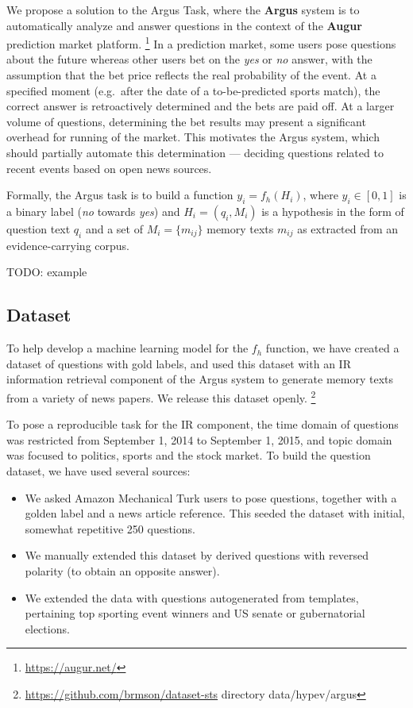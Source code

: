 \documentclass[11pt]{article}
\begin{document}
We propose a solution to the Argus Task, where
the \textbf{Argus} system \cite{arguswp} \cite{argus}
is to automatically analyze and answer questions
in the context of the \textbf{Augur} prediction market platform.%
\footnote{\url{https://augur.net/}}
In a prediction market, some users pose questions about the future
whereas other users bet on the \textit{yes} or \textit{no} answer,
with the assumption that the bet price reflects the real probability
of the event.  At a specified moment (e.g.\ after the date of a to-be-predicted sports match), the
correct answer is retroactively determined and the bets are paid off.
At a larger volume of questions, determining the bet results may
present a significant overhead for running of the market.
This motivates the Argus system, which should partially automate
this determination --- deciding questions related to recent events
based on open news sources.

Formally, the Argus task is to build a function $y_i = f_h(H_i)$,
where $y_i \in [0,1]$ is a binary label (\textit{no} towards \textit{yes})
and $H_i = (q_i, M_i)$ is a hypothesis in the form of question text $q_i$
and a set of $M_i = \{m_{ij}\}$ memory texts $m_{ij}$ as extracted
from an evidence-carrying corpus.

TODO: example


\subsection{Dataset}

To help develop a machine learning model for the $f_h$ function,
we have created a dataset of questions with gold labels, and used
this dataset with an IR information retrieval component of the Argus
system to generate memory texts from a variety of news papers.
We release this dataset openly.%
\footnote{\url{https://github.com/brmson/dataset-sts} directory data/hypev/argus}

To pose a reproducible task for the IR component, the time domain
of questions was restricted from September 1, 2014 to September 1, 2015,
and topic domain was focused to politics, sports and the stock market.
To build the question dataset, we have used several sources:
\begin{itemize}
	\item We asked Amazon Mechanical Turk users to pose questions, together with a golden label and a news article reference.
		This seeded the dataset with initial, somewhat repetitive 250 questions.
	\item We manually extended this dataset by derived questions with reversed polarity (to obtain an opposite answer).
	\item We extended the data with questions autogenerated from templates, pertaining top sporting event winners and US senate or gubernatorial elections.
\end{itemize}
\end{document}
